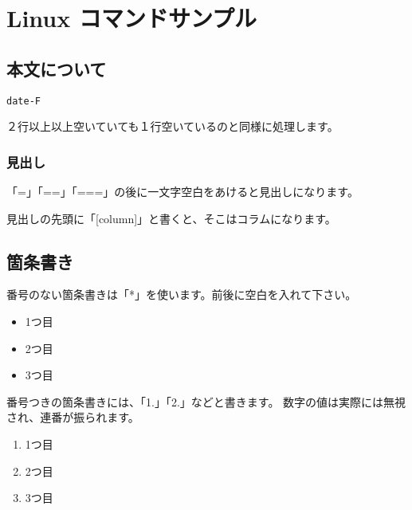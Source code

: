 \chapter{Linux コマンドサンプル}
\label{chap:ch01}

\section{本文について}
\begin{reviewlist}
\begin{alltt}
 \textdollar{}date -F
\end{alltt}
\end{reviewlist}


２行以上以上空いていても１行空いているのと同様に処理します。

\subsection{見出し}

「=」「==」「===」の後に一文字空白をあけると見出しになります。

\begin{reviewcolumn}

見出しの先頭に「[column]」と書くと、そこはコラムになります。

\end{reviewcolumn}

\section{箇条書き}

番号のない箇条書きは「*」を使います。前後に空白を入れて下さい。

\begin{itemize}
\item 1つ目
\item 2つ目
\item 3つ目
\end{itemize}

番号つきの箇条書きには、「1.」「2.」などと書きます。
数字の値は実際には無視され、連番が振られます。

\begin{enumerate}
\item 1つ目
\item 2つ目
\item 3つ目
\end{enumerate}

